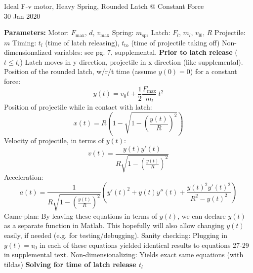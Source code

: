 \documentclass[12pt]{article}
\begin{document}
\begin{center}
    Ideal F-v motor, Heavy Spring, Rounded Latch @ Constant Force \\
    30 Jan 2020
\end{center}

\noindent \textbf{Parameters:}
\newline
Motor: $F_{\text{max}}$, $d$, $v_{\text{max}}$ \newline
Spring: $m_{\text{spr}}$ \newline
Latch: $F_l$, $m_l$, $v_{\text{l0}}$, $R$ \newline
Projectile: $m$ \newline
Timing: $t_l$ (time of latch releasing), $t_{\text{to}}$ (time of projectile taking off)
\newline
Non-dimensionalized variables: see pg. 7, supplemental.
\newline \newline
\noindent \textbf{Prior to latch release} ($t \leq t_l$)
\newline
Latch moves in y direction, projectile in x direction (like supplemental).
\newline
Position of the rounded latch, w/r/t time (assume $y(0) = 0$) for a constant force:
\[ 
    y(t) = v_0 t + \frac{1}{2} \frac{F_{\text{max}}}{m_l}\ t^2
\]
Position of projectile while in contact with latch:
\[
    x(t) = R \left(1 - \sqrt{1-\left( \frac{y(t)}{R} \right) ^2}\right)
\]
Velocity of projectile, in terms of $y(t)$:
\[
    v(t) = \frac{y(t)y'(t)}{R\sqrt{1 - \left(\frac{y(t)}{R}\right)^2}}
\]
Acceleration:
\[
    a(t) = \frac{1}{R \sqrt{1 - \left( \frac{y(t)}{R} \right) ^2}} \left( y'(t)^2 + y(t)y''(t) + \frac{y(t)^2 y'(t)^2}{R^2 - y(t)^2}\right)
\]
\newline
Game-plan: By leaving these equations in terms of $y(t)$, we can declare $y(t)$ as a separate function in Matlab. This hopefully will also allow changing $y(t)$ easily, if needed (e.g. for testing/debugging).
\newline \newline
Sanity checking: Plugging in $y(t) = v_0$ in each of these equations yielded identical results to equations 27-29 in supplemental text.
\newline \newline
Non-dimensionalizing: Yields exact same equations (with tildas)
\newline 
\newline
\noindent \textbf{Solving for time of latch release $t_l$}
\newline
\end{document}

